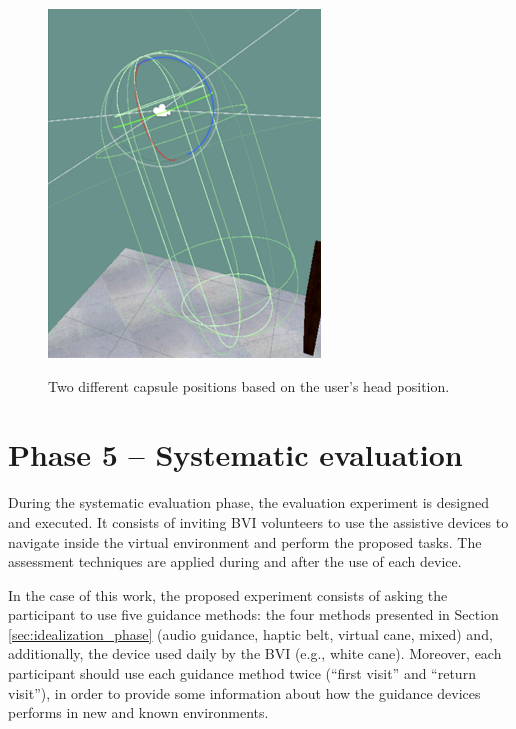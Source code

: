 \begin{figure}[!htb]
\begin{minipage}{0.45\textwidth}
                \includegraphics[width = 0.8\linewidth]{Metodologia/envelope2.png}
                \label{fig:user_looking_down}
            \end{minipage}
            \caption{Two different capsule positions based on the user's head position.}
            \label{fig:user_envelope}
        \end{figure}

\section{Phase 5 – Systematic evaluation}
\label{sec:experiment}
        
During the systematic evaluation phase, the evaluation experiment is designed and executed. It consists of inviting BVI volunteers to use the assistive devices to navigate inside the virtual environment and perform the proposed tasks. The assessment techniques are applied during and after the use of each device.

In the case of this work, the proposed experiment consists of asking the participant to use five guidance methods: the four methods presented in Section \ref{sec:idealization_phase} (audio guidance, haptic belt, virtual cane, mixed) and, additionally, the device used daily by the BVI (e.g., white cane). Moreover, each participant should use each guidance method twice (“first visit” and “return visit”), in order to provide some information about how the guidance devices performs in new and known environments.

